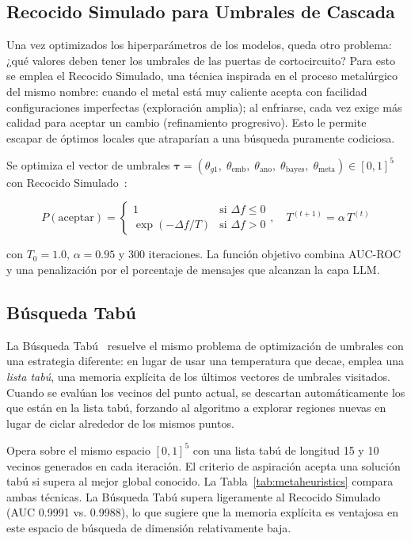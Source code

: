\documentclass{llncs}
\begin{document}
\subsection{Recocido Simulado para Umbrales de Cascada}
\label{sec:meta:sa}

Una vez optimizados los hiperparámetros de los modelos, queda
otro problema: ¿qué valores deben tener los umbrales de las
puertas de cortocircuito?
Para esto se emplea el Recocido Simulado, una técnica inspirada
en el proceso metalúrgico del mismo nombre: cuando el metal está
muy caliente acepta con facilidad configuraciones imperfectas
(exploración amplia); al enfriarse, cada vez exige más calidad
para aceptar un cambio (refinamiento progresivo).
Esto le permite escapar de óptimos locales que atraparían a una
búsqueda puramente codiciosa.

Se optimiza el vector de umbrales
$\boldsymbol{\tau} = (\theta_{g1},\; \theta_{\mathrm{emb}},\;
\theta_{\mathrm{ano}},\; \theta_{\mathrm{bayes}},\;
\theta_{\mathrm{meta}}) \in [0,1]^5$
con Recocido Simulado~\cite{kirkpatrick1983}:

\begin{equation}
  P(\mathrm{aceptar}) = \begin{cases}
    1 & \text{si } \Delta f \leq 0 \\
    \exp(-\Delta f / T) & \text{si } \Delta f > 0
  \end{cases},
  \quad T^{(t+1)} = \alpha\, T^{(t)}
  \label{eq:sa}
\end{equation}

con $T_0=1.0$, $\alpha=0.95$ y 300 iteraciones.
La función objetivo combina AUC-ROC y una penalización por
el porcentaje de mensajes que alcanzan la capa LLM.

\subsection{Búsqueda Tabú}
\label{sec:meta:tabu}

La Búsqueda Tabú~\cite{glover1989} resuelve el mismo problema
de optimización de umbrales con una estrategia diferente:
en lugar de usar una temperatura que decae, emplea una
\emph{lista tabú}, una memoria explícita de los últimos vectores
de umbrales visitados.
Cuando se evalúan los vecinos del punto actual, se descartan
automáticamente los que están en la lista tabú, forzando al
algoritmo a explorar regiones nuevas en lugar de ciclar
alrededor de los mismos puntos.

Opera sobre el mismo espacio $[0,1]^5$ con una lista tabú
de longitud 15 y 10 vecinos generados en cada iteración.
El criterio de aspiración acepta una solución tabú si supera
al mejor global conocido.
La Tabla~\ref{tab:metaheuristics} compara ambas técnicas.
La Búsqueda Tabú supera ligeramente al Recocido Simulado
(AUC 0.9991 vs. 0.9988), lo que sugiere que la memoria explícita
es ventajosa en este espacio de búsqueda de dimensión relativamente baja.
\end{document}

